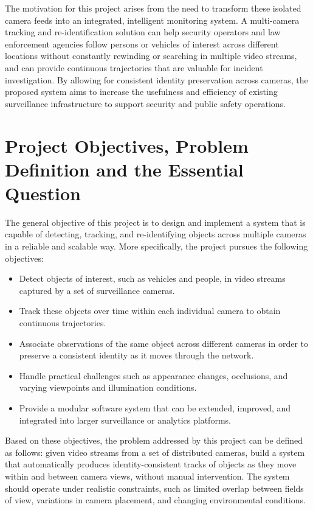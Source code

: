 The motivation for this project arises from the need to transform these isolated camera feeds into an integrated, intelligent monitoring system. A multi-camera tracking and re-identification solution can help security operators and law enforcement agencies follow persons or vehicles of interest across different locations without constantly rewinding or searching in multiple video streams, and can provide continuous trajectories that are valuable for incident investigation. By allowing for consistent identity preservation across cameras, the proposed system aims to increase the usefulness and efficiency of existing surveillance infrastructure to support security and public safety operations.

\section{Project Objectives, Problem Definition and the Essential Question}

The general objective of this project is to design and implement a system that is capable of detecting, tracking, and re-identifying objects across multiple cameras in a reliable and scalable way. More specifically, the project pursues the following objectives:

\begin{itemize}
    \item Detect objects of interest, such as vehicles and people, in video streams captured by a set of surveillance cameras.
    \item Track these objects over time within each individual camera to obtain continuous trajectories.
    \item Associate observations of the same object across different cameras in order to preserve a consistent identity as it moves through the network.
    \item Handle practical challenges such as appearance changes, occlusions, and varying viewpoints and illumination conditions.
    \item Provide a modular software system that can be extended, improved, and integrated into larger surveillance or analytics platforms.
\end{itemize}

Based on these objectives, the problem addressed by this project can be defined as follows: given video streams from a set of distributed cameras, build a system that automatically produces identity-consistent tracks of objects as they move within and between camera views, without manual intervention. The system should operate under realistic constraints, such as limited overlap between fields of view, variations in camera placement, and changing environmental conditions.

